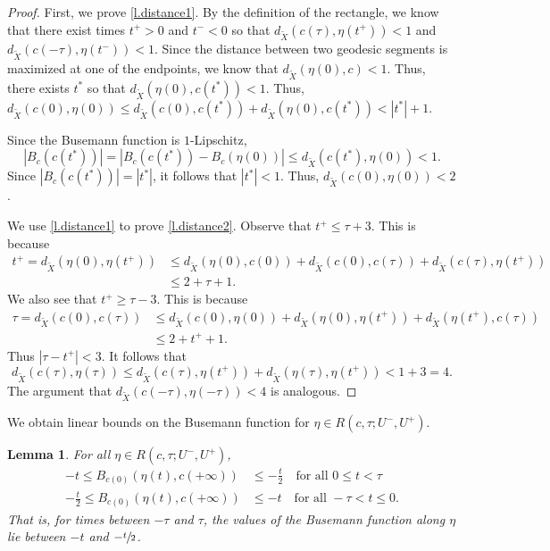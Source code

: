 \documentclass[11pt]{article}
\newtheorem{lem}[thm]{Lemma}
\theoremstyle{definition}
\numberwithin{equation}{section}
\begin{document}
\begin{proof}

First, we prove \eqref{l.distance1}. By the definition of the rectangle, we know that there exist times $t^+>0$ and $t^-<0$ so that $d_{\tilde X}(c(\tau), \eta(t^+))<1$ and $d_{\tilde X}(c(-\tau), \eta(t^-))<1$. Since the distance between two geodesic segments is maximized at one of the endpoints, we know that $d_{\tilde X}(\eta(0), c)<1$. Thus, there exists $t^\ast$ so that $d_{\tilde X}(\eta(0), c(t^\ast))<1$. Thus, $d_{\tilde X}(c(0), \eta(0)) \leq d_{\tilde X}(c(0), c(t^\ast))+ d_{\tilde X}(\eta(0), c(t^\ast)) < |t^\ast|+1$.

Since the Busemann function is $1$-Lipschitz,
\[|B_c(c(t^\ast))| = |B_c(c(t^\ast))- B_c(\eta(0))| \leq d_{\tilde X}(c(t^\ast), \eta(0)) <1.\]
Since $|B_c(c(t^\ast))| = |t^\ast|$, it follows that $|t^\ast|<1$. Thus, $d_{\tilde X}(c(0), \eta(0))<2$.

We use \eqref{l.distance1} to prove \eqref{l.distance2}. Observe that $t^+\leq \tau+3$. This is because
\begin{align*}
t^+=d_{\tilde X}(\eta(0), \eta(t^+)) &\leq d_{\tilde X}(\eta(0), c(0))+ d_{\tilde X}(c(0), c(\tau)) + d_{\tilde X}(c(\tau), \eta(t^+)) \\
& \leq 2+\tau +1.
\end{align*}
We also see that $t^+\geq \tau-3$. This is because
\begin{align*}
\tau = d_{\tilde X}(c(0), c(\tau)) & \leq d_{\tilde X}(c(0), \eta(0))+d_{\tilde X}(\eta(0), \eta(t^+))+d_{\tilde X}(\eta(t^+), c(\tau)) \\
& \leq 2 + t^+ +1.
\end{align*}
Thus $|\tau-t^+| <3$. It follows that
\[d_{\tilde X}(c(\tau), \eta(\tau)) \leq d_{\tilde X}(c (\tau), \eta(t^+))+ d_{\tilde X}(\eta(\tau), \eta(t^+))< 1+ 3 = 4.\]
The argument that $d_{\tilde X}(c(-\tau), \eta(-\tau))<4$ is analogous.
\end{proof}

We obtain linear bounds on the Busemann function for $\eta \in R(c, \tau; U^-,U^+)$.

\begin{lem}\label{lem:linear}
For all $\eta \in R(c, \tau; U^-, U^+)$,
\begin{align*}
-t \leq B_{c(0)}(\eta(t),c(+\infty)) &\leq - \frac{t}{2} \quad\mbox{for all } 0\leq t<\tau\\
\tag*{and}
-\frac{t}{2} \leq B_{c(0)}(\eta(t),c(+\infty)) &\leq - t \quad\mbox{for all } -\tau < t \leq 0.
\end{align*}
That is, for times between $-\tau$ and $\tau$, the values of the Busemann function along $\eta$ lie between $-t$ and $-\sfrac{t}{2}$.
\end{lem}
\end{document}
